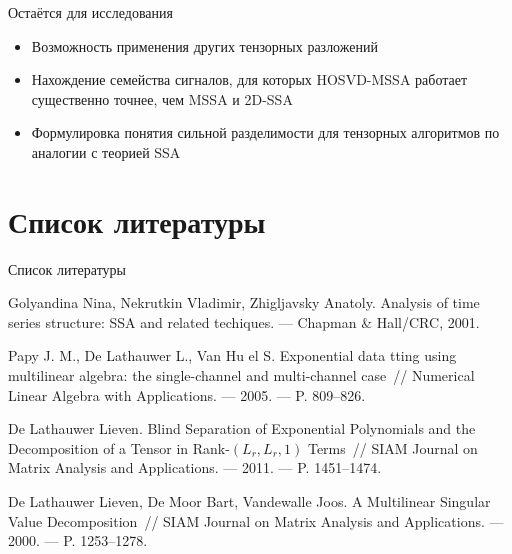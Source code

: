 \documentclass[ucs, notheorems, handout]{beamer}
\begin{document}
    \begin{frame}{Остаётся для исследования}
        \begin{itemize}
            \item Возможность применения других тензорных разложений
            \item Нахождение семейства сигналов, для которых HOSVD-MSSA работает существенно точнее, чем MSSA и 2D-SSA 
            \item Формулировка понятия сильной разделимости для тензорных алгоритмов по аналогии с теорией SSA
        \end{itemize}
        
    \end{frame}


    \section{Список литературы}\label{sec:bib}
    \begin{frame}{Список литературы}
        \begin{thebibliography}{4}
            Golyandina Nina, Nekrutkin Vladimir, Zhigljavsky Anatoly.
            Analysis of time series structure: SSA and related techiques.
            --- Chapman \& Hall/CRC, 2001.

            Papy J. M., De Lathauwer L., Van Hu el S.
            Exponential data tting using multilinear algebra: the single-channel
            and multi-channel case~//
            Numerical Linear Algebra with Applications. --- 2005. --- P. 809--826.

            De Lathauwer Lieven.
            Blind Separation of Exponential Polynomials and the Decomposition
            of a Tensor in Rank-$(L_r, L_r, 1)$ Terms~//
            SIAM Journal on Matrix Analysis and Applications. --- 2011. --- P. 1451--1474.

            De Lathauwer Lieven, De Moor Bart, Vandewalle Joos.
            A Multilinear Singular Value Decomposition~//
            SIAM Journal on Matrix Analysis and Applications.
            --- 2000. --- P. 1253--1278.

        \end{thebibliography}

    \end{frame}
\end{document}
